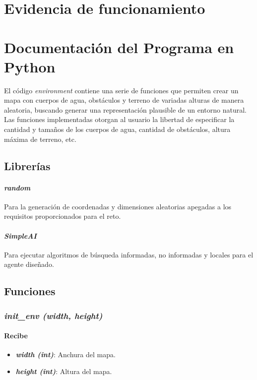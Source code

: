 \documentclass[12pt, letterpaper]{article}
\begin{document}
\section{Evidencia de funcionamiento}

\section{Documentación del Programa en Python}
El código \textit{environment} contiene una serie de funciones que permiten crear un mapa con cuerpos de agua, obstáculos y terreno de variadas alturas de manera aleatoria, buscando generar una representación plausible de un entorno natural.\\
Las funciones implementadas otorgan al usuario la libertad de especificar la cantidad y tamaños de los cuerpos de agua, cantidad de obstáculos, altura máxima de terreno, etc.
    \subsection{Librerías}
        \paragraph{\textit{random}}\cite{abdugafforovna2023modules} Para la generación de coordenadas y dimensiones aleatorias apegadas a los requisitos proporcionados para el reto.
        \paragraph{\textit{SimpleAI}}\cite{thaker2020python} Para ejecutar algoritmos de búsqueda informadas, no informadas y locales para el agente diseñado.
    \subsection{Funciones}
        \subsubsection{\textit{init\_env (width, height)}}
            \paragraph{Recibe}
                \begin{itemize}
                    \item \textbf{\textit{width (int)}}: Anchura del mapa.
                    \item \textbf{\textit{height (int)}}: Altura del mapa.
                \end{itemize}
\end{document}
